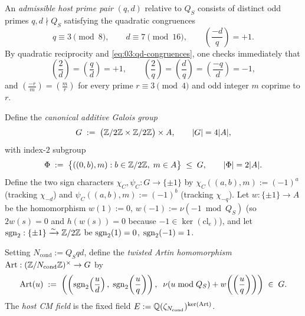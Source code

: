 \begin{definition}
\label{def:03:host-cm}
An \emph{admissible host prime pair} $(q, d)$ relative to $Q_S$ consists of distinct odd primes $q, d \nmid Q_S$ satisfying the quadratic congruences
\begin{equation}
\label{eq:03:qd-congruences}
  q \equiv 3 \pmod{8}, \qquad d \equiv 7 \pmod{16}, \qquad \left(\frac{-d}{q}\right) = +1.
\end{equation}
By quadratic reciprocity and \eqref{eq:03:qd-congruences}, one checks immediately that
\[
  \left(\frac{2}{d}\right) = \left(\frac{q}{d}\right) = +1, \qquad
  \left(\frac{2}{q}\right) = \left(\frac{d}{q}\right) = \left(\frac{-q}{d}\right) = -1,
\]
and $(\frac{-r}{m}) = (\frac{m}{r})$ for every prime $r \equiv 3 \pmod 4$ and odd integer $m$ coprime to $r$.

Define the \emph{canonical additive Galois group}
\begin{equation}
\label{eq:03:G-def}
  G \;:=\; \bigl(\mathbb{Z}/2\mathbb{Z} \times \mathbb{Z}/2\mathbb{Z}\bigr) \times A, \qquad |G| = 4|A|,
\end{equation}
with index-$2$ subgroup
\[
  \Phi \;:=\; \bigl\{((0, b), m) : b \in \mathbb{Z}/2\mathbb{Z},\; m \in A\bigr\} \;\le\; G, \qquad |\Phi| = 2|A|.
\]
Define the two sign characters $\chi_C, \psi_C : G \to \{\pm 1\}$ by $\chi_C((a,b), m) := (-1)^a$ (tracking $\chi_{-d}$) and $\psi_C((a,b), m) := (-1)^b$ (tracking $\chi_{-q}$). Let $w : \{\pm 1\} \to A$ be the homomorphism $w(1) := 0$, $w(-1) := \nu(-1 \bmod Q_S)$ (so $2w(s) = 0$ and $h(w(s)) = 0$ because $-1 \in \ker(\mathrm{cl}_e)$), and let $\operatorname{sgn}_2 : \{\pm 1\} \xrightarrow{\sim} \mathbb{Z}/2\mathbb{Z}$ be $\operatorname{sgn}_2(1) = 0$, $\operatorname{sgn}_2(-1) = 1$.

Setting $N_{\mathrm{cond}} := Q_S q d$, define the \emph{twisted Artin homomorphism} $\mathrm{Art} : (\mathbb{Z}/N_{\mathrm{cond}}\mathbb{Z})^\times \to G$ by
\begin{equation}
\label{eq:03:twisted-artin}
  \mathrm{Art}(u) \;:=\; \left(\left(\operatorname{sgn}_2\!\left(\frac{u}{d}\right),\; \operatorname{sgn}_2\!\left(\frac{u}{q}\right)\right),\;\; \nu(u \bmod Q_S) + w\!\left(\left(\frac{u}{q}\right)\right)\right) \;\in\; G.
\end{equation}
The \emph{host CM field} is the fixed field $E := \mathbb{Q}(\zeta_{N_{\mathrm{cond}}})^{\ker(\mathrm{Art})}$.
\end{definition}


